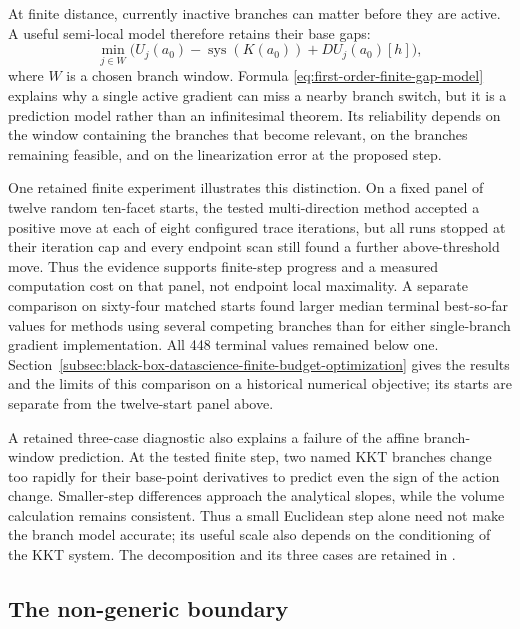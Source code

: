 At finite distance, currently inactive branches can matter before they are
active.  A useful semi-local model therefore retains their base gaps:
\begin{equation}\label{eq:first-order-finite-gap-model}
  \min_{j\in W}
  \bigl(
    U_j(a_0)-\operatorname{sys}(K(a_0))+DU_j(a_0)[h]
  \bigr),
\end{equation}
where \(W\) is a chosen branch window.  Formula
\eqref{eq:first-order-finite-gap-model} explains why a single active gradient
can miss a nearby branch switch, but it is a prediction model rather than an
infinitesimal theorem.  Its reliability depends on the window containing the
branches that become relevant, on the branches remaining feasible, and on the
linearization error at the proposed step.

One retained finite experiment illustrates this distinction.  On a fixed
panel of twelve random ten-facet starts, the tested multi-direction
method accepted a positive move at each of eight configured trace iterations,
but all runs stopped at their iteration cap and every endpoint scan still
found a further above-threshold move.  Thus the evidence supports finite-step
progress and a measured computation cost on that panel, not endpoint local
maximality.  A separate comparison on sixty-four matched starts found larger median
terminal best-so-far values for methods using several competing branches
than for either single-branch gradient implementation. All 448 terminal
values remained below one. Section~\ref{subsec:black-box-datascience-finite-budget-optimization}
gives the results and the limits of this comparison on a historical numerical
objective; its starts are separate from the twelve-start panel above.

A retained three-case diagnostic also explains a failure of the affine
branch-window prediction. At the tested finite step, two named KKT branches
change too rapidly for their base-point derivatives to predict even the sign
of the action change. Smaller-step differences approach the analytical
slopes, while the volume calculation remains consistent. Thus a small
Euclidean step alone need not make the branch model accurate; its useful
scale also depends on the conditioning of the KKT system. The decomposition and
its three cases are retained in
.

\subsection{The non-generic boundary}
\label{subsec:first-order-nongeneric-boundary}

